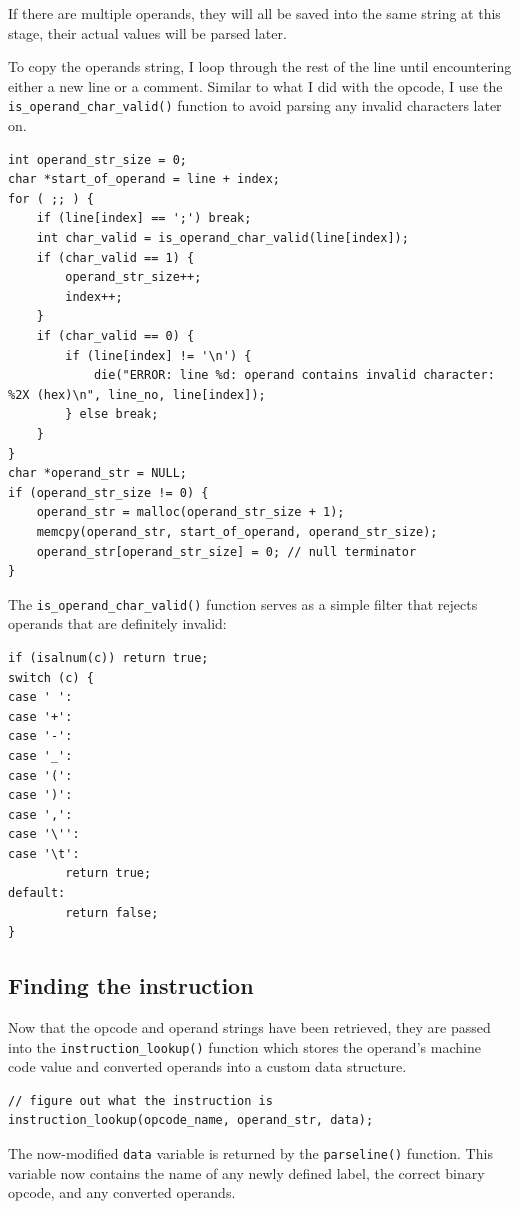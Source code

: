 \documentclass[a4paper]{report}
\begin{document}
If there are multiple operands, they will all be saved into the same string at
this stage, their actual values will be parsed later.

To copy the operands string, I loop through the rest of the line until
encountering either a new line or a comment. Similar to what I did with the
opcode, I use the \texttt{is\_operand\_char\_valid()} function to avoid parsing
any invalid characters later on.

\begin{lstlisting}
int operand_str_size = 0;
char *start_of_operand = line + index;
for ( ;; ) {
	if (line[index] == ';') break;
	int char_valid = is_operand_char_valid(line[index]);
	if (char_valid == 1) {
		operand_str_size++;
		index++;
	}
	if (char_valid == 0) {
		if (line[index] != '\n') {
			die("ERROR: line %d: operand contains invalid character: %2X (hex)\n", line_no, line[index]);
		} else break;
	}
}
char *operand_str = NULL;
if (operand_str_size != 0) {
	operand_str = malloc(operand_str_size + 1);
	memcpy(operand_str, start_of_operand, operand_str_size);
	operand_str[operand_str_size] = 0; // null terminator
}
\end{lstlisting}

The \texttt{is\_operand\_char\_valid()} function serves as a simple filter that
rejects operands that are definitely invalid:

\begin{lstlisting}
if (isalnum(c)) return true;
switch (c) {
case ' ':
case '+':
case '-':
case '_':
case '(':
case ')':
case ',':
case '\'':
case '\t':
		return true;
default:
		return false;
}
\end{lstlisting}

\subsection{Finding the instruction}

Now that the opcode and operand strings have been retrieved, they are passed
into the \texttt{instruction\_lookup()} function which stores the operand's
machine code value and converted operands into a custom data structure.

\begin{lstlisting}
// figure out what the instruction is
instruction_lookup(opcode_name, operand_str, data);
\end{lstlisting}

The now-modified \texttt{data} variable is returned by the \texttt{parseline()}
function. This variable now contains the name of any newly defined label, the
correct binary opcode, and any converted operands.
\end{document}
